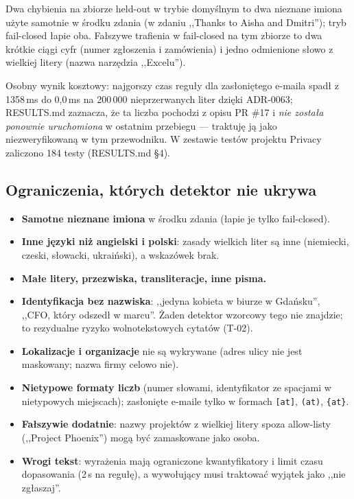 Dwa chybienia na zbiorze held-out w trybie domyślnym to dwa nieznane imiona
użyte samotnie w środku zdania (w zdaniu ,,Thanks to Aisha and Dmitri''); tryb
fail-closed łapie oba. Fałszywe trafienia w fail-closed na tym zbiorze to dwa
krótkie ciągi cyfr (numer zgłoszenia i zamówienia) i jedno odmienione słowo z
wielkiej litery (nazwa narzędzia ,,Excelu'').

Osobny wynik kosztowy: najgorszy czas reguły dla zasłoniętego e-maila spadł z
1358\,ms do 0,0\,ms na 200\,000 nieprzerwanych liter dzięki ADR-0063; RESULTS.md
zaznacza, że ta liczba pochodzi z opisu PR \#17 i \emph{nie została ponownie
uruchomiona} w ostatnim przebiegu --- traktuję ją jako niezweryfikowaną w tym
przewodniku. W zestawie testów projektu Privacy zaliczono 184 testy (RESULTS.md §4).

\subsection{Ograniczenia, których detektor nie ukrywa}

\begin{itemize}[leftmargin=*]
    \item \textbf{Samotne nieznane imiona} w środku zdania (łapie je tylko
    fail-closed).
    \item \textbf{Inne języki niż angielski i polski}: zasady wielkich liter
    są inne (niemiecki, czeski, słowacki, ukraiński), a wskazówek brak.
    \item \textbf{Małe litery, przezwiska, transliteracje, inne pisma.}
    \item \textbf{Identyfikacja bez nazwiska}: ,,jedyna kobieta w biurze w
    Gdańsku'', ,,CFO, który odszedł w marcu''. Żaden detektor wzorcowy tego nie
    znajdzie; to rezydualne ryzyko wolnotekstowych cytatów (T-02).
    \item \textbf{Lokalizacje i organizacje} nie są wykrywane (adres ulicy
    nie jest maskowany; nazwa firmy celowo nie).
    \item \textbf{Nietypowe formaty liczb} (numer słowami, identyfikator ze
    spacjami w nietypowych miejscach); zasłonięte e-maile tylko w formach
    \texttt{[at]}, \texttt{(at)}, \texttt{\{at\}}.
    \item \textbf{Fałszywie dodatnie}: nazwy projektów z wielkiej litery spoza
    allow-listy (,,Project Phoenix'') mogą być zamaskowane jako osoba.
    \item \textbf{Wrogi tekst}: wyrażenia mają ograniczone kwantyfikatory i
    limit czasu dopasowania (2\,s na regułę), a wywołujący musi traktować wyjątek jako
    ,,nie zgłaszaj''.
\end{itemize}

